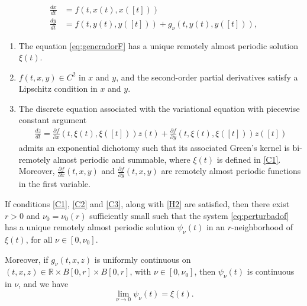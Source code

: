 \documentclass[10pt,a4paper]{amsart}
\begin{document}
\begin{align}
\frac{dx}{dt} & =f\left(t,x(t),x([t])\right)\label{eq:generadorF}\\
\frac{dy}{dt} & =f\left(t,y(t),y([t])\right)+g_{\nu}\left(t,y\left(t\right),y([t])\right),\label{eq:perturbadof}
\end{align}

\begin{enumerate}[label=\textbf{(C.\arabic*)}]
\item\label{C1} The equation \eqref{eq:generadorF} has a unique remotely almost periodic solution $\xi(t)$.
\item\label{C2} $f(t, x, y) \in C^{2}$ in $x$ and $y$, and the second-order partial derivatives satisfy a Lipschitz condition in $x$ and $y$.
\item\label{C3} The discrete equation associated with the variational equation with piecewise constant argument
\begin{eqnarray*}
\frac{dz}{dt} = \frac{\partial f}{\partial x}(t, \xi(t), \xi([t])) z(t) + \frac{\partial f}{\partial y}(t, \xi(t), \xi([t])) z([t])
\end{eqnarray*}
admits an exponential dichotomy such that its associated Green's kernel is bi-remotely almost periodic and summable, where $\xi(t)$ is defined in \ref{C1}.  
Moreover, $\frac{\partial f}{\partial x}(t, x, y)$ and $\frac{\partial f}{\partial y}(t, x, y)$ are remotely almost periodic functions in the first variable.
\end{enumerate}

\begin{thm}\label{perturbed_f_nolineal}
If conditions \ref{C1}, \ref{C2} and \ref{C3}, along with \ref{H2} are satisfied,  
then there exist $r > 0$ and $\nu_0 = \nu_0(r)$ sufficiently small such that the system \eqref{eq:perturbadof}  
has a unique remotely almost periodic solution $\psi_\nu(t)$ in an $r$-neighborhood of $\xi(t)$, for all $\nu \in [0, \nu_0]$.

Moreover, if $g_\nu(t, x, z)$ is uniformly continuous on $(t, x, z) \in \mathbb{R} \times B[0, r] \times B[0, r]$, with $\nu \in [0, \nu_0]$,  
then $\psi_\nu(t)$ is continuous in $\nu$, and we have  
\[
\lim_{\nu \rightarrow 0} \psi_\nu(t) = \xi(t).
\]
\end{thm}
\end{document}
